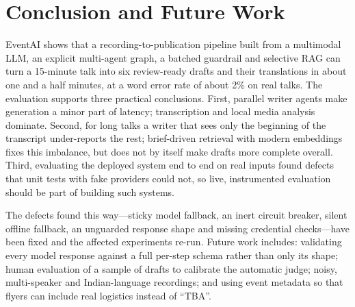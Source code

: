 \section{Conclusion and Future Work}
EventAI shows that a recording-to-publication pipeline built from a multimodal LLM, an explicit
multi-agent graph, a batched guardrail and selective RAG can turn a 15-minute talk into six
review-ready drafts and their translations in about one and a half minutes, at a word error
rate of about 2\% on real talks. The evaluation supports three practical conclusions. First,
parallel writer agents make generation a minor part of latency; transcription and local media
analysis dominate. Second, for long talks a writer that sees only the beginning of the
transcript under-reports the rest; brief-driven retrieval with modern embeddings fixes this
imbalance, but does not by itself make drafts more complete overall. Third, evaluating the
deployed system end to end on real inputs found defects that unit tests with fake providers
could not, so live, instrumented evaluation should be part of building such systems.

The defects found this way---sticky model fallback, an inert circuit breaker, silent offline
fallback, an unguarded response shape and missing credential checks---have been fixed and the
affected experiments re-run. Future work includes: validating every model response against a
full per-step schema rather than only its shape; human evaluation of a sample of drafts to
calibrate the automatic judge; noisy, multi-speaker and Indian-language recordings; and using
event metadata so that flyers can include real logistics instead of ``TBA''.
